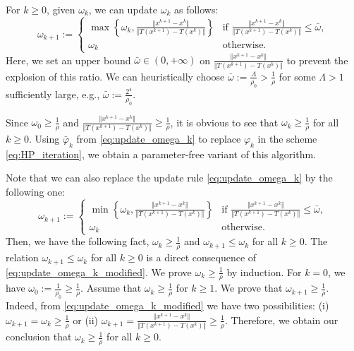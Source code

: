 \documentclass{article}
\theoremstyle{plain}
\theoremstyle{definition}
\newcommand{\set}[1]{\left\{#1\right\}}
\newcommand{\norms}[1]{\Vert#1\Vert}
\newcommand{\0}{\boldsymbol{0}}
\begin{document}
For $k \geq 0$, given $\omega_k$, we can update $\omega_k$ as follows:
\begin{equation}\label{eq:update_omega_k}
\omega_{k+1} := \begin{cases}
\max\set{ \omega_k, \frac{\norms{x^{k+1} - x^k } }{ \norms{T(x^{k+1}) - T(x^{k})} } } & \textrm{if $\frac{\norms{x^{k+1} - x^k } }{ \norms{T(x^{k+1}) - T(x^{k})} } \leq \bar{\omega}$}, \\
\omega_k & \textrm{otherwise}.
\end{cases}
\end{equation}
Here, we set an upper bound $\bar{\omega} \in (0, +\infty)$ on $\frac{ \norms{x^{k+1} - x^k } }{ \norms{T(x^{k+1}) - T(x^{k})} }$ to prevent the explosion of this ratio.
We can heuristically choose $\bar{\omega} := \frac{\Lambda}{\rho_0} > \frac{1}{\rho}$ for some $\Lambda > 1$ sufficiently large, e.g., $\bar{\omega} := \frac{2^4}{\rho_0}$.


Since $\omega_0 \geq \frac{1}{\rho}$ and $\frac{\norms{x^{k+1} - x^k } }{ \norms{T(x^{k+1}) - T(x^{k})} } \geq \frac{1}{\rho}$, it is obvious to see that $\omega_k \geq \frac{1}{\rho}$ for all $k \geq 0$.
Using $\bar{\varphi}_k$ from \eqref{eq:update_omega_k} to replace $\varphi_k$ in the scheme \eqref{eq:HP_iteration}, we obtain a parameter-free variant of this algorithm.

Note that we can also replace the update rule \eqref{eq:update_omega_k} by the following one:
\begin{equation}\label{eq:update_omega_k_modified}
\omega_{k+1} := \begin{cases}
\min\set{ \omega_k, \frac{\norms{x^{k+1} - x^k } }{ \norms{T(x^{k+1}) - T(x^{k})} } } & \textrm{if $\frac{\norms{x^{k+1} - x^k } }{ \norms{T(x^{k+1}) - T(x^{k})} } \leq \bar{\omega}$}, \\
\omega_k & \textrm{otherwise}.
\end{cases}
\end{equation}
Then, we have the following fact, $\omega_k \geq \frac{1}{\rho}$ and $\omega_{k+1} \leq \omega_k$ for all $k \geq 0$.
The relation $\omega_{k+1} \leq \omega_k$ for all $k \geq 0$ is a direct consequence of \eqref{eq:update_omega_k_modified}.
We prove $\omega_k \geq \frac{1}{\rho}$ by induction. 
For $k = 0$, we have $\omega_0 := \frac{1}{\rho_0} \geq \frac{1}{\rho}$.
Assume that  $\omega_k \geq \frac{1}{\rho}$ for $k \geq 1$.
We prove that $\omega_{k+1} \geq \frac{1}{\rho}$.
Indeed, from \eqref{eq:update_omega_k_modified} we have two possibilities: (i) $\omega_{k+1} = \omega_k \geq \frac{1}{\rho}$ or (ii) $\omega_{k+1} = \frac{\norms{x^{k+1} - x^k } }{ \norms{T(x^{k+1}) - T(x^{k})} } \geq \frac{1}{\rho}$.
Therefore, we obtain our conclusion that $\omega_k \geq \frac{1}{\rho}$ for all $k \geq 0$. 
\end{document}
